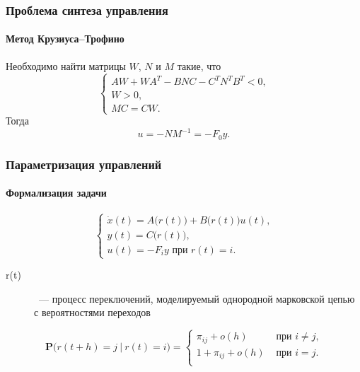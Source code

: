 \documentclass[ignorenonframetext,hyperref={pdftex,unicode},compress,handout]{beamer}
\newcommand{\br}{\vspace{12pt}}
\begin{document}
\begin{frame}
    \frametitle{Проблема синтеза управления}
    \framesubtitle{Метод Крузиуса--Трофино}
    \par Необходимо найти матрицы $W$, $N$ и $M$ такие, что
    \begin{equation}
        \left\{
            \begin{array}{l}
                AW + WA^T - BNC - C^TN^TB^T < 0\mbox{,} \\
                W > 0\mbox{,} \\
                MC = CW\mbox{.}
            \end{array}
        \right.
    \end{equation}
    \br
    Тогда
    \begin{equation}
        u = -NM^{-1} = -F_0y\mbox{.}
    \end{equation}
\end{frame}




\begin{frame}
    \frametitle{Параметризация управлений}
    \framesubtitle{Формализация задачи}
    \begin{equation}
        \left\{
            \begin{array}{l}
                \dot{x}(t) = A\big( r(t) \big) + B\big( r(t) \big) u(t)\mbox{,} \\
                y(t) = C\big( r(t) \big)\mbox{,} \\
                u(t) = -F_iy\mbox{ при } r(t)=i\mbox{.}
            \end{array}
        \right.
    \end{equation}
    \br
    \begin{description}
        \item[r(t)]~--- процесс переключений, моделируемый однородной марковской цепью с вероятностями переходов
    \end{description}
    \begin{equation}
        \mathbf{P}\big(r(t+h) = j~|~r(t) = i \big) = \left\{
            \begin{array}{ll}
                \pi_{ij} + o(h) & \mbox{ при } i \neq j\mbox{,} \\
                1 + \pi_{ij} + o(h) & \mbox{ при } i = j\mbox{.} \\
            \end{array}
        \right.
    \end{equation}
\end{frame}
\end{document}

